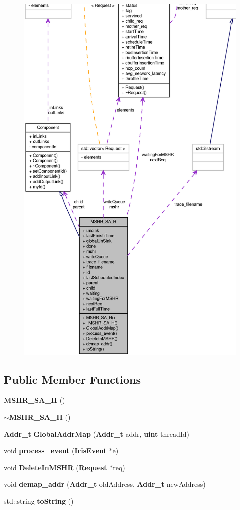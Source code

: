 \begin{figure}[H]
\begin{center}
\leavevmode
\includegraphics[width=400pt]{classMSHR__SA__H__coll__graph}
\end{center}
\end{figure}
\subsection*{Public Member Functions}
\begin{CompactItemize}
\item 
{\bf MSHR\_\-SA\_\-H} ()
\item 
{\bf $\sim$MSHR\_\-SA\_\-H} ()
\item 
{\bf Addr\_\-t} {\bf GlobalAddrMap} ({\bf Addr\_\-t} addr, {\bf uint} threadId)
\item 
void {\bf process\_\-event} ({\bf IrisEvent} $\ast$e)
\item 
void {\bf DeleteInMSHR} ({\bf Request} $\ast$req)
\item 
void {\bf demap\_\-addr} ({\bf Addr\_\-t} oldAddress, {\bf Addr\_\-t} newAddress)
\item 
std::string {\bf toString} ()
\end{CompactItemize}
